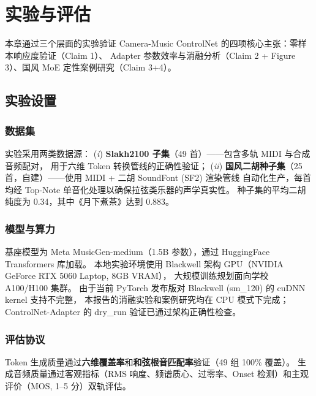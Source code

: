 \documentclass[UTF8,12pt,a4paper]{ctexart}
\begin{document}
\section{实验与评估}

本章通过三个层面的实验验证 Camera-Music ControlNet 的四项核心主张：零样本响应度验证（Claim 1）、
Adapter 参数效率与消融分析（Claim 2 + Figure 3）、国风 MoE 定性案例研究（Claim 3+4）。

\subsection{实验设置}

\subsubsection{数据集}

实验采用两类数据源：
(\textit{i}) \textbf{Slakh2100 子集}（49 首）\cite{slakh}——包含多轨 MIDI 与合成音频配对，
用于六维 Token 转换管线的正确性验证；
(\textit{ii}) \textbf{国风二胡种子集}（25 首，自建）——使用 MIDI + 二胡 SoundFont (SF2) 渲染管线
自动化生产，每首均经 Top-Note 单音化处理以确保拉弦类乐器的声学真实性。
种子集的平均二胡纯度为 0.34，其中《月下煮茶》达到 0.883。

\subsubsection{模型与算力}

基座模型为 Meta MusicGen-medium（1.5B 参数），通过 HuggingFace Transformers 库加载。
本地实验环境使用 Blackwell 架构 GPU（NVIDIA GeForce RTX 5060 Laptop, 8GB VRAM），
大规模训练规划面向学校 A100/H100 集群。
由于当前 PyTorch 发布版对 Blackwell (sm\_120) 的 cuDNN kernel 支持不完整，
本报告的消融实验和案例研究均在 CPU 模式下完成；
ControlNet-Adapter 的 dry\_run 验证已通过架构正确性检查。

\subsubsection{评估协议}

Token 生成质量通过\textbf{六维覆盖率}和\textbf{和弦根音匹配率}验证（49 组 100\% 覆盖）。
生成音频质量通过客观指标（RMS 响度、频谱质心、过零率、Onset 检测）和主观评价（MOS, 1--5 分）双轨评估。
\end{document}
